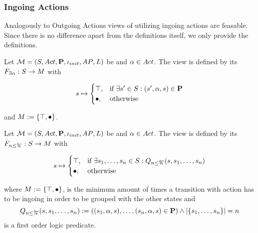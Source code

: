 \documentclass[preview]{standalone}
\begin{document}
\subsubsection{Ingoing Actions}
Analogously to Outgoing Actions views of utilizing ingoing actions are feasable. Since there is no difference apart from the definitions itself, we only provide the definitions.

\begin{definition}
	Let ${{{\mathcal{M}}}} = {{({S}, {Act}, {\textbf{P}}, {\iota_{init}}, {AP}, {L})}}$ be \achgphN and ${\alpha} \in {Act}$. The view \viewhasinaction is defined by its \grpfctN ${{F_{{\exists{\alpha}}}}} : {S} \to {\ensuremath{{M}}}$ with 
	
	\[
	{s} \mapsto
	\begin{cases}
			{\top},				& \text{if } \exists {s}' \in {S}: ({s}', {\alpha}, {s}) \in {\ensuremath{{\textbf{P}}}} \\
			{\bullet},          	& \text{otherwise}
		\end{cases}
	\]
	
	and ${{M}} := {\{{\top}, {\bullet}\}}$.	
	\label{def:mininaction}
\end{definition}	


\begin{definition}
	Let ${{{\mathcal{M}}}} = {{({S}, {Act}, {\textbf{P}}, {\iota_{init}}, {AP}, {L})}}$ be \achgphN and ${\alpha} \in {Act}$. The view \viewmininaction is defined by its \grpfctN ${{F_{{{n}\leq{\overleftarrow{\ensuremath{{\alpha}}}}}}}} : {S} \to {M}$ with
	
	\[
	{s} \mapsto
	\begin{cases}
			{\top},				& \text{if } \exists {s}_1, \dots, {s}_{n} \in {S}:  {Q_{{n}\leq{\overleftarrow{\ensuremath{{\alpha}}}}}({s},{s}_1, \dots, {s}_{{n}})}\\
			{\bullet},          	& \text{otherwise}
		\end{cases}
	\]
	
	where ${{M}} := {\{{\top}, {\bullet}\}}$,
	 is the minimum amount of times a transition with action \action has to be ingoing in order to be grouped with the other states and
	\[
	{Q_{{n}\leq{\overleftarrow{\ensuremath{{\alpha}}}}}({s},{s}_1, \dots, {s}_{{n}})} := (({s}_1, {\alpha}, {s}), \dots, ({s}_{n}, {\alpha}, {s}) \in {\ensuremath{{\textbf{P}}}}) \land |\{{s}_1, \dots, {s}_{n}\}| = {n}
	\]
	is a first order logic predicate.
	\label{def:viewmaxinaction}
\end{definition}
\end{document}
